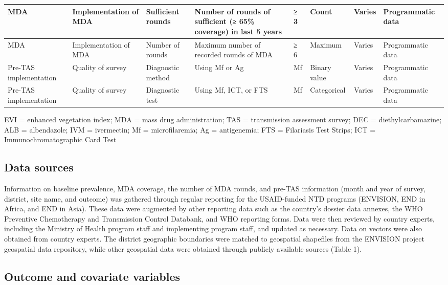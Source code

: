 \documentclass[11pt,a4paper]{article}
\begin{document}
\begin{table}[h]
\begin{tabular}{|l|l|l|l|l|l|l|l|}
MDA & Implementation of MDA & Sufficient rounds & Number of rounds of sufficient (≥ 65\% coverage) in last 5 years & ≥ 3 & Count & Varies & Programmatic data \\ \hline
MDA & Implementation of MDA & Number of rounds & Maximum number of recorded rounds of MDA & ≥ 6 & Maximum & Varies & Programmatic data \\ \hline
Pre-TAS implementation & Quality of survey & Diagnostic method & Using Mf or Ag & Mf & Binary value & Varies & Programmatic data \\ \hline
Pre-TAS implementation & Quality of survey & Diagnostic test & Using Mf, ICT, or FTS & Mf & Categorical & Varies & Programmatic data \\ \hline
\end{tabular}
\end{table}

EVI = enhanced vegetation index; MDA = mass drug administration; TAS = transmission assessment survey; DEC = diethylcarbamazine; ALB = albendazole; IVM = ivermectin; Mf = microfilaremia; Ag = antigenemia; FTS = Filariasis Test Strips; ICT = Immunochromatographic Card Test

\subsection{Data sources}

Information on baseline prevalence, MDA coverage, the number of MDA rounds, and pre-TAS information (month and year of survey, district, site name, and outcome) was gathered through regular reporting for the USAID-funded NTD programs (ENVISION, END in Africa, and END in Asia). These data were augmented by other reporting data such as the country’s dossier data annexes, the WHO Preventive Chemotherapy and Transmission Control Databank, and WHO reporting forms. Data were then reviewed by country experts, including the Ministry of Health program staff and implementing program staff, and updated as necessary. Data on vectors were also obtained from country experts. The district geographic boundaries were matched to geospatial shapefiles from the ENVISION project geospatial data repository, while other geospatial data were obtained through publicly available sources (Table 1).

\subsection{Outcome and covariate variables}
\end{document}

